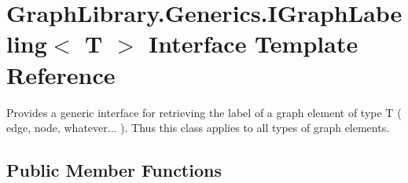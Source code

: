 \hypertarget{interface_graph_library_1_1_generics_1_1_i_graph_labeling}{}\section{Graph\+Library.\+Generics.\+I\+Graph\+Labeling$<$ T $>$ Interface Template Reference}
\label{interface_graph_library_1_1_generics_1_1_i_graph_labeling}


Provides a generic interface for retrieving the label of a graph element of type T ( edge, node, whatever... ). Thus this class applies to all types of graph elements.  


\subsection*{Public Member Functions}
